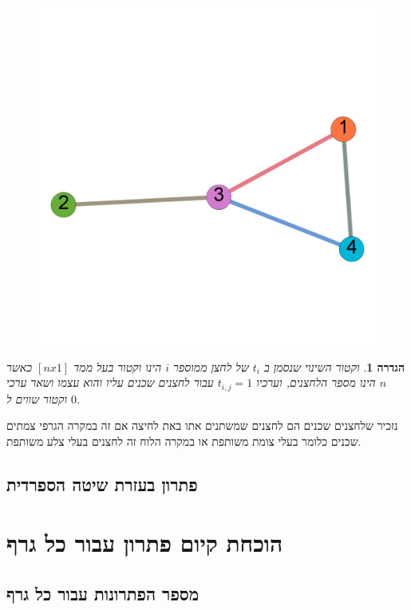 \documentclass[12pt,twoside]{article}
\newtheorem{definition}{הגדרה}[section]
\begin{document}
\begin{figure}[h]
    \caption{}
    \label{fig:numbering_graph}
    \unsethebrew
    \centering
    \includegraphics[width=.7\textwidth,height=.7\textheight,keepaspectratio]{images/numbering_graph.PNG}
\end{figure}
\sethebrew

\begin{definition}
    וקטור השינוי
    שנסמן ב
    $t_i$
    של לחצן
    ממוספר
    $i$
    הינו וקטור בעל ממד
    $[n x 1]$
    כאשר 
    $n$
    הינו מספר הלחצנים,
    וערכיו
    $t_{i,j} = 1$
    עבור לחצנים
    שכנים עליו והוא עצמו
    ושאר ערכי וקטור שווים ל
    $0$.

\end{definition}

נזכיר שלחצנים שכנים הם לחצנים שמשתנים אתו באת לחיצה 
אם זה במקרה הגרפי צמתים שכנים כלומר בעלי צומת משותפת
או במקרה הלוח זה לחצנים בעלי צלע משותפת.





\subsection{פתרון בעזרת שיטה הספרדית}

\section{הוכחת  קיום פתרון עבור כל גרף}

\subsection{מספר הפתרונות עבור כל גרף}
\end{document}
